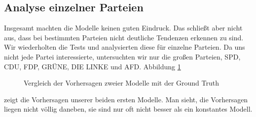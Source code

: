 \documentclass[a4paper,10pt]{scrartcl}
\begin{document}
\subsection{Analyse einzelner Parteien}
Insgesamt machten die Modelle keinen guten Eindruck. Das schließt aber nicht aus, dass bei bestimmten Parteien nicht deutliche Tendenzen erkennen zu sind. Wir wiederholten die Tests und analysierten diese für einzelne Parteien. Da uns nicht jede Partei interessierte, untersuchten wir nur die großen Parteien, SPD, CDU, FDP, GRÜNE, DIE LINKE und AFD. Abbildung \ref{fig:simple_parties} \begin{figure}[h]
	\centering
	\caption{Vergleich der Vorhersagen zweier Modelle mit der Ground Truth}
	\label{fig:simple_parties}
	\end{figure}  
	zeigt die Vorhersagen unserer beiden ersten Modelle. Man sieht, die Vorhersagen liegen nicht völlig daneben, sie sind nur oft nicht besser als ein konstantes Modell.
\end{document}
